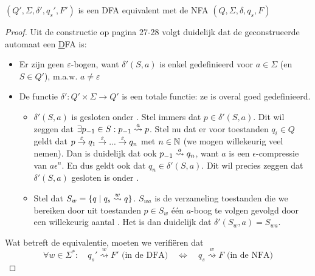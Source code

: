 \documentclass[../aanvullingen_cursus.tex]{subfiles}
\begin{document}
\begin{stelling}
	\( (Q',\Sigma, \delta', q_s',F') \) is een DFA equivalent met de NFA \((Q,\Sigma,\delta,q_s,F)\)
\end{stelling}

\begin{proof}
	Uit de constructie op pagina 27-28 volgt duidelijk dat de geconstrueerde automaat een \underline{D}FA is:
	\begin{itemize}
		\item Er zijn geen \( \varepsilon \)-bogen, want \( \delta'(S,a) \) is enkel gedefinieerd voor \( a \in \Sigma \) (en \( S\in Q' \)), m.a.w. \( a\neq \varepsilon \)
		\item De functie \( \delta':Q' \times \Sigma \to Q' \) is een totale functie: ze is overal goed gedefinieerd.
		\begin{itemize}
			\item \(\delta'(S,a)\) is gesloten onder \epsilonbogen. Stel immers dat \(p \in \delta'(S,a)\). Dit wil zeggen dat \(\exists p_{-1} \in S : p_{-1}\overset{a}{\rightsquigarrow}p\). Stel nu dat er voor toestanden \(q_i\in Q\) geldt dat \(p\overset{\varepsilon}{\rightarrow}q_1\overset{\varepsilon}{\rightarrow}...\overset{\varepsilon}{\rightarrow}q_n\) met \(n\in \mathbb{N}\) (we mogen willekeurig veel \epsilonbogens nemen). Dan is duidelijk dat ook \(p_{-1}\overset{a}{\rightsquigarrow}q_n\), want \(a\) is een \(\epsilon\)-compressie van \(a\epsilon^n\). En dus geldt ook dat \(q_n \in \delta'(S,a)\). Dit wil precies zeggen dat \(\delta'(S,a)\) gesloten is onder \epsilonbogen.
			\item Stel dat \(S_w=\{q \mid q_s \overset{w}{\rightsquigarrow} q\}\). \(S_{wa}\) is de verzameling toestanden die we bereiken door uit toestanden \(p \in S_w\) één \(a\)-boog te volgen gevolgd door een willekeurig aantal \epsilonbogen. Het is dan duidelijk dat  \(\delta'(S_w,a)=S_{wa}\).
		\end{itemize}
	\end{itemize}

	Wat betreft de equivalentie, moeten we verifiëren dat \[ \forall w \in \Sigma^*: \quad q_s' \overset{w}{\rightsquigarrow} F'  \text{ (in de DFA)} \quad \Longleftrightarrow \quad q_s \overset{w}{\rightsquigarrow} F \text{ (in de NFA)}\]


\end{proof}
\end{document}

